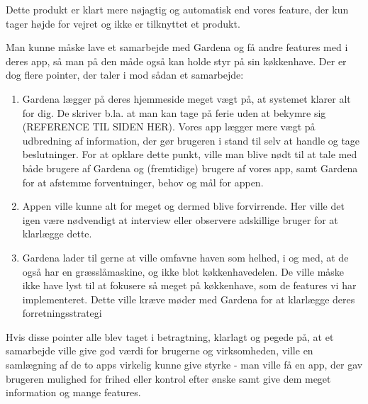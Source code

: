 Dette produkt er klart mere nøjagtig og automatisk end vores feature, der kun tager højde for vejret og ikke er tilknyttet et produkt.

Man kunne måske lave et samarbejde med Gardena og få andre features med i deres app, så man på den måde også kan holde styr på sin køkkenhave. Der er dog flere pointer, der taler i mod sådan et samarbejde:

\begin{enumerate}
    \item{Gardena lægger på deres hjemmeside meget vægt på, at systemet klarer alt for dig. De skriver b.la. at man kan tage på ferie uden at bekymre sig (REFERENCE TIL SIDEN HER). Vores app lægger mere vægt på udbredning af information, der gør brugeren i stand til selv at handle og tage beslutninger. For at opklare dette punkt, ville man blive nødt til at tale med både brugere af Gardena og (fremtidige) brugere af vores app, samt Gardena for at afstemme forventninger, behov og mål for appen.}
    \item{Appen ville kunne alt for meget og dermed blive forvirrende. Her ville det igen være nødvendigt at interview eller observere adskillige bruger for at klarlægge dette.}
    \item{Gardena lader til gerne at ville omfavne haven som helhed, i og med, at de også har en græsslåmaskine, og ikke blot køkkenhavedelen. De ville måske ikke have lyst til at fokusere så meget på køkkenhave, som de features vi har implementeret. Dette ville kræve møder med Gardena for at klarlægge deres forretningsstrategi}
\end{enumerate}

Hvis disse pointer alle blev taget i betragtning, klarlagt og pegede på, at et samarbejde ville give god værdi for brugerne og virksomheden, ville en samlægning af de to apps virkelig kunne give styrke - man ville få en app, der gav brugeren mulighed for frihed eller kontrol efter ønske samt give dem meget information og mange features. 



